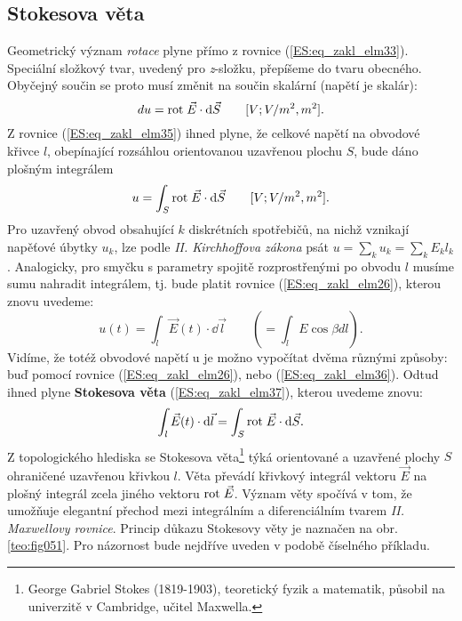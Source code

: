       \subsection{Stokesova věta}\label{ES:sec06}
        Geometrický význam \emph{rotace} plyne přímo z rovnice (\ref{ES:eq_zakl_elm33}). Speciální 
        složkový tvar, uvedený pro \emph{z}-složku, přepíšeme do tvaru obecného. Obyčejný součin se 
        proto musí změnit na součin skalární (napětí je skalár):
        \begin{equation}\label{ES:eq_zakl_elm35}
          du = \mathrm{rot}\;\vec{E}\cdot \mathop{}\!\mathrm{d}\vec{S} \qquad[V; V/m^2, m^2].
        \end{equation}
        Z rovnice (\ref{ES:eq_zakl_elm35}) ihned plyne, že celkové napětí na obvodové křivce \(l\), 
        obepínající rozsáhlou orientovanou uzavřenou plochu \(S\), bude dáno plošným integrálem
        \begin{equation}\label{ES:eq_zakl_elm36}
          u = \int_S\mathrm{rot}\;\vec{E} \cdot \mathop{}\!\mathrm{d}\vec{S} \qquad[V; V/m^2, m^2].
        \end{equation}
        Pro uzavřený obvod obsahující \(k\) diskrétních spotřebičů, na nichž vznikají napěťové 
        úbytky \(u_k\), lze podle \emph{II. Kirchhoffova zákona} psát \(u=\sum_ku_k 
        =\sum_kE_kl_k\). Analogicky, pro smyčku s parametry spojitě rozprostřenými po obvodu \(l\) 
        musíme sumu nahradit integrálem, tj. bude platit rovnice  (\ref{ES:eq_zakl_elm26}), kterou 
        znovu uvedeme:
        \begin{equation*}
          u(t) = \int_{l}\vec{E}(t)\cdot \dd{\vec{l}} \qquad (=\int_lE\cos\beta dl).
        \end{equation*}
        Vidíme, že totéž obvodové napětí u je možno vypočítat dvěma různými způsoby: buď pomocí 
        rovnice  (\ref{ES:eq_zakl_elm26}), nebo (\ref{ES:eq_zakl_elm36}). Odtud ihned plyne 
        \textbf{Stokesova věta} (\ref{ES:eq_zakl_elm37}), kterou uvedeme znovu:
        \begin{equation}\label{ES:eq_zakl_elm37}
          \int_{l}\vec{E}(t)\cdot \mathop{}\!\mathrm{d}\vec{l} = \int_S\mathrm{rot}\;\vec{E} \cdot \mathop{}\!\mathrm{d}\vec{S}.
        \end{equation}
        Z topologického hlediska se Stokesova věta\footnote{George Gabriel Stokes (1819-1903), 
        teoretický fyzik a matematik, působil na univerzitě v Cambridge, učitel Maxwella.} týká 
        orientované a uzavřené plochy \(S\) ohraničené uzavřenou křivkou \(l\). Věta převádí 
        křivkový integrál vektoru \(\vec{E}\) na plošný integrál zcela jiného vektoru \(\mathrm{rot}\;\vec{E}\). 
        Význam věty spočívá v tom, že umožňuje elegantní přechod mezi integrálním a diferenciálním 
        tvarem \emph{II. Maxwellovy rovnice}. Princip důkazu Stokesovy věty je naznačen na obr. 
        \ref{teo:fig051}. Pro názornost bude nejdříve uveden v podobě číselného 
        příkladu.
        
